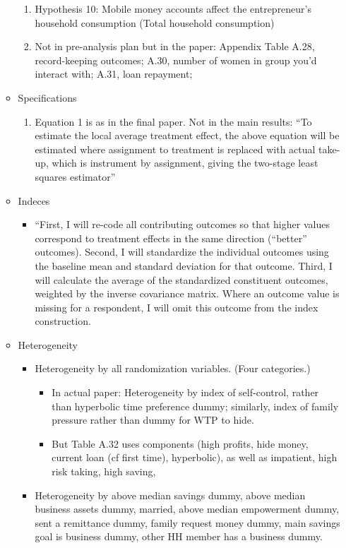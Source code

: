 \documentclass[]{article}
\begin{document}
\begin{itemize}
\begin{itemize}
\begin{enumerate}
		\item Hypothesis 10: Mobile money accounts affect the entrepreneur’s household consumption (Total household consumption)
		\item Not in pre-analysis plan but in the paper: Appendix Table A.28, record-keeping outcomes; A.30, number of women in group you'd interact with; A.31, loan repayment; 
	\end{enumerate}
	\item Specifications 
	\begin{enumerate}
		\item Equation 1 is as in the final paper. Not in the main results: ``To estimate the local average treatment effect, the above equation will be estimated where assignment to treatment is replaced with actual take-up, which is instrument by assignment, giving the two-stage least squares estimator''
	\end{enumerate}
	\item Indeces
	\begin{itemize}
		\item  ``First, I will re-code all contributing outcomes so that higher values correspond to treatment effects in the same direction (“better” outcomes). Second, I will standardize the individual outcomes using the baseline mean and standard deviation for that outcome. Third, I will calculate the average of the standardized constituent outcomes, weighted by the inverse covariance matrix. Where an outcome value is missing for a respondent, I will omit this outcome from the index construction.
	\end{itemize}
	\item Heterogeneity
	\begin{itemize}
		\item Heterogeneity by all randomization variables. (Four categories.)
		\begin{itemize}
			\item In actual paper: Heterogeneity by index of self-control, rather than hyperbolic time preference dummy; similarly, index of family pressure rather than dummy for WTP to hide.
			\item But Table A.32 uses components (high profits, hide money, current loan (cf first time), hyperbolic), as well as impatient, high risk taking, high saving,
		\end{itemize}
		\item Heterogeneity by above median savings dummy, above median business assets dummy, married, above median empowerment dummy, sent a remittance dummy, family request money dummy, main savings goal is business dummy, other HH member has a business dummy.

\end{itemize}
\end{itemize}
\end{itemize}
\end{document}
